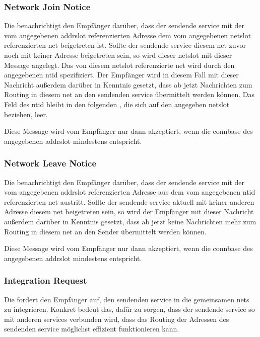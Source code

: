 \subsubsection{Network Join Notice}
\label{dcl-isproto-njn}
Die \msg{\isprotonjn} benachrichtigt den Empfänger darüber, dass der sendende \gls{service} mit der
vom angegebenen \gls{addrslot} referenzierten Adresse dem vom angegebenen \gls{netslot} referenzierten
\gls{net} beigetreten ist. Sollte der sendende \gls{service} diesem \gls{net} zuvor noch mit keiner
Adresse beigetreten sein, so wird dieser \gls{netslot} mit dieser Message angelegt. Das von diesem
\gls{netslot} referenzierte \gls{net} wird durch den angegebenen \gls{ntid} spezifiziert.
Der Empfänger wird in diesem Fall mit dieser Nachricht außerdem darüber in Kenntnis gesetzt, dass
ab jetzt Nachrichten zum Routing in diesem \gls{net} an den sendenden \gls{service} übermittelt
werden können.
Das Feld des \gls{ntid} bleibt in den folgenden \msg{\isprotonjn}, die sich auf den angegeben
\gls{netslot} beziehen, leer.

Diese Message wird vom Empfänger nur dann akzeptiert, wenn die \gls{connbase} des angegebenen
\gls{addrslot} mindestens  entspricht.

\isprotonjnbytefield

\subsubsection{Network Leave Notice}
\label{dcl-isproto-nln}
Die \msg{\isprotonln} benachrichtigt den Empfänger darüber, dass der sendende \gls{service} mit der
vom angegebenen \gls{addrslot} referenzierten Adresse aus dem vom angegebenen \gls{ntid}
referenzierten \gls{net} austritt. Sollte der sendende \gls{service} aktuell mit keiner anderen
Adresse diesem \gls{net} beigetreten sein, so wird der Empfänger mit dieser Nachricht außerdem
darüber in Kenntnis gesetzt, dass ab jetzt keine Nachrichten mehr zum Routing in diesem \gls{net}
an den Sender übermittelt werden können.

Diese Message wird vom Empfänger nur dann akzeptiert, wenn die \gls{connbase} des angegebenen
\gls{addrslot} mindestens  entspricht.

\isprotonlnbytefield


\subsubsection{Integration Request}
\label{dcl-isproto-ireq}
Die \msg{\isprotoireq} fordert den Empfänger auf, den sendenden \gls{service} in die gemeinsamen
\glspl{net} zu integrieren. Konkret bedeut das, dafür zu sorgen, dass der sendende \gls{service}
so mit anderen \glspl{service} verbunden wird, dass das Routing der Adressen des sendenden
\gls{service} möglichst effizient funktionieren kann.

